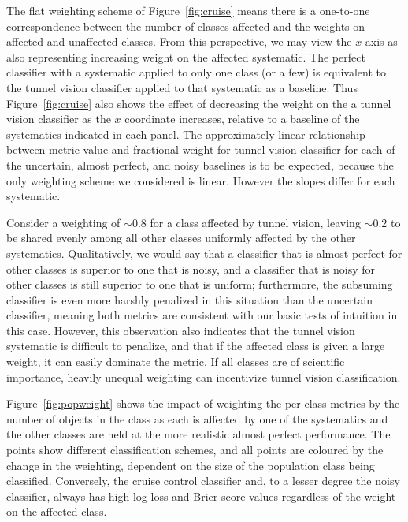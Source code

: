 The flat weighting scheme of Figure~\ref{fig:cruise} means there is a one-to-one correspondence between the number of classes affected and the weights on affected and unaffected classes.
From this perspective, we may view the $x$ axis as also representing increasing weight on the affected systematic.
The perfect classifier with a systematic applied to only one class (or a few) is equivalent to the tunnel vision classifier applied to that systematic as a baseline.
Thus Figure~\ref{fig:cruise} also shows the effect of decreasing the weight on the a tunnel vision classifier as the $x$ coordinate increases, relative to a baseline of the systematics indicated in each panel.
The approximately linear relationship between metric value and fractional weight for tunnel vision classifier for each of the uncertain, almost perfect, and noisy baselines is to be expected, because the only weighting scheme we considered is linear.
However the slopes differ for each systematic.

Consider a weighting of $\sim0.8$ for a class affected by tunnel vision, leaving $\sim0.2$ to be shared evenly among all other classes uniformly affected by the other systematics.
Qualitatively, we would say that a classifier that is almost perfect for other classes is superior to one that is noisy, and a classifier that is noisy for other classes is still superior to one that is uniform; furthermore, the subsuming classifier is even more harshly penalized in this situation than the uncertain classifier, meaning both metrics are  consistent with our basic tests of intuition in this case.
However, this observation also indicates that the tunnel vision systematic is difficult to penalize, and that if the affected class is given a large weight, it can easily dominate the metric.
If all classes are of scientific importance, heavily unequal weighting can incentivize tunnel vision classification.

Figure~\ref{fig:popweight} shows the impact of weighting the per-class metrics by the number of objects in the class as each is affected by one of the systematics and the other classes are held at the more realistic almost perfect performance.
The points show different classification schemes, and all points are coloured by the change in the weighting, dependent on the size of the population class being classified.
Conversely, the cruise control classifier and, to a lesser degree the noisy classifier, always has high log-loss and Brier score values regardless of the weight on the affected class.

